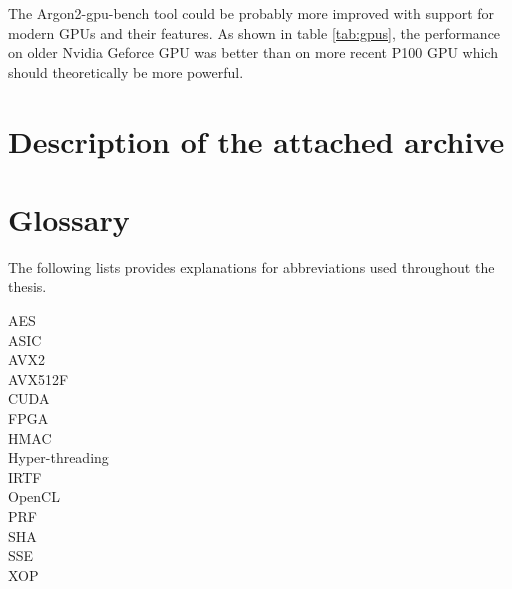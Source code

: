 \documentclass[nolof]{fithesis3}
\begin{document}
The Argon2-gpu-bench tool could be probably more improved with support for modern GPUs and their features. As shown in table \ref{tab:gpus}, the performance on older Nvidia Geforce GPU was better than on more recent P100 GPU which should theoretically be more powerful.

\printbibliography
\appendix
\chapter{Description of the attached archive}

\chapter{Glossary}
The following lists provides explanations for abbreviations used throughout the thesis.

\begin{description}
\item[AES]

\item[ASIC]

\item[AVX2]

\item[AVX512F]

\item[CUDA]

\item[FPGA]

\item[HMAC]

\item[Hyper-threading]

\item[IRTF]

\item[OpenCL]

\item[PRF]

\item[SHA]

\item[SSE]

\item[XOP]
\end{description}
\end{document}
